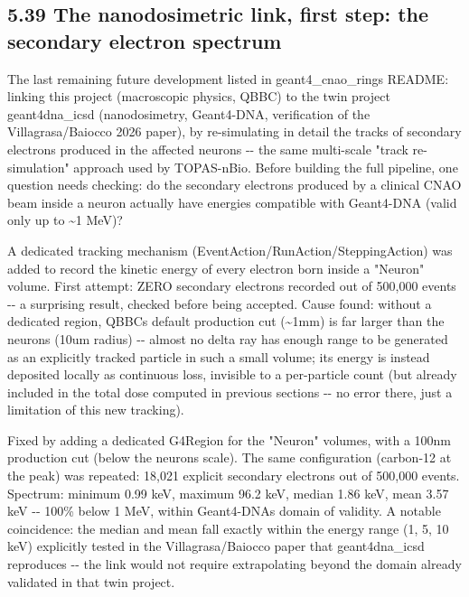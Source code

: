 \documentclass[
  english,
]{article}
\begin{document}


\subsection{5.39 The nanodosimetric link, first step: the secondary electron spectrum}\label{the-nanodosimetric-link-first-step-the-secondary-electron-spectrum}

The last remaining future development listed in geant4\_\allowbreak{}cnao\_\allowbreak{}ring\textquotesingle s README: linking this project (macroscopic physics, QBBC) to the twin project geant4dna\_\allowbreak{}icsd (nanodosimetry, Geant4-DNA, verification of the Villagrasa/Baiocco 2026 paper), by re-simulating in detail the tracks of secondary electrons produced in the affected neurons -\/- the same multi-scale "track re-simulation" approach used by TOPAS-nBio. Before building the full pipeline, one question needs checking: do the secondary electrons produced by a clinical CNAO beam inside a neuron actually have energies compatible with Geant4-DNA (valid only up to \textasciitilde1 MeV)?

A dedicated tracking mechanism (EventAction/RunAction/SteppingAction) was added to record the kinetic energy of every electron born inside a "Neuron" volume. First attempt: ZERO secondary electrons recorded out of 500,000 events -\/- a surprising result, checked before being accepted. Cause found: without a dedicated region, QBBC\textquotesingle s default production cut (\textasciitilde1mm) is far larger than the neurons (10um radius) -\/- almost no delta ray has enough range to be generated as an explicitly tracked particle in such a small volume; its energy is instead deposited locally as continuous loss, invisible to a per-particle count (but already included in the total dose computed in previous sections -\/- no error there, just a limitation of this new tracking).

Fixed by adding a dedicated G4Region for the "Neuron" volumes, with a 100nm production cut (below the neuron\textquotesingle s scale). The same configuration (carbon-12 at the peak) was repeated: 18,021 explicit secondary electrons out of 500,000 events. Spectrum: minimum 0.99 keV, maximum 96.2 keV, median 1.86 keV, mean 3.57 keV -\/- 100\% below 1 MeV, within Geant4-DNA\textquotesingle s domain of validity. A notable coincidence: the median and mean fall exactly within the energy range (1, 5, 10 keV) explicitly tested in the Villagrasa/Baiocco paper that geant4dna\_\allowbreak{}icsd reproduces -\/- the link would not require extrapolating beyond the domain already validated in that twin project.
\end{document}
